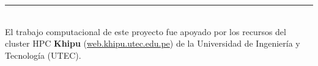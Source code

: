 \documentclass[11pt,a4paper]{article}
\begin{document}
\vspace{0.6cm}
\begin{center}\small\color{black!55}
\rule{0.5\textwidth}{0.4pt}\\[0.3cm]
El trabajo computacional de este proyecto fue apoyado por los recursos del
cluster HPC \textbf{Khipu} (\href{https://web.khipu.utec.edu.pe/}{web.khipu.utec.edu.pe})
de la Universidad de Ingeniería y Tecnología (UTEC).
\end{center}
\end{document}

